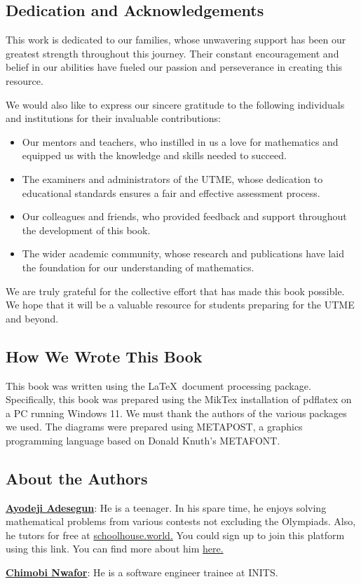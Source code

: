 \documentclass[a4paper]{book}
\begin{document}
\begin{frontmatter}
\chapter*{Dedication and Acknowledgements}

This work is dedicated to our families, whose unwavering support has been our greatest strength throughout this journey. Their constant encouragement and belief in our abilities have fueled our passion and perseverance in creating this resource.

We would also like to express our sincere gratitude to the following individuals and institutions for their invaluable contributions:
\begin{itemize}
\item Our mentors and teachers, who instilled in us a love for mathematics and equipped us with the knowledge and skills needed to succeed.
\item The examiners and administrators of the UTME, whose dedication to educational standards ensures a fair and effective assessment process.
\item  Our colleagues and friends, who provided feedback and support throughout the development of this book.
\item The wider academic community, whose research and publications have laid the foundation for our understanding of mathematics.
\end{itemize}

We are truly grateful for the collective effort that has made this book possible. We hope that it will be a valuable resource for students preparing for the UTME and beyond.

\section*{How We Wrote This Book}
This book was written using the  \LaTeX \ document processing package. Specifically, this book was prepared using the MikTex installation of pdflatex on a PC running Windows 11. We must thank the authors of the various packages we used. The diagrams were prepared using METAPOST, a graphics programming language based on Donald Knuth's METAFONT.

\section*{About the Authors}
\begin{description}
\item \href{https://linkedin.com/in/ayodejiades}{\textbf{Ayodeji Adesegun}}: He is a teenager. In his spare time, he enjoys solving mathematical problems from various contests not excluding the Olympiads. Also, he tutors for free at \href{https://schoolhouse.world/ref}{schoolhouse.world.} You could sign up to join this platform using this link. You can find more about him \href{https://ayodejiades.vercel.app}{here.}
\item \href{https://linkedin.com/in/jeremaih-nwafor}{\textbf{Chimobi Nwafor}}: He is a software engineer trainee at INITS. 
\end{description}


\end{frontmatter}
\end{document}
